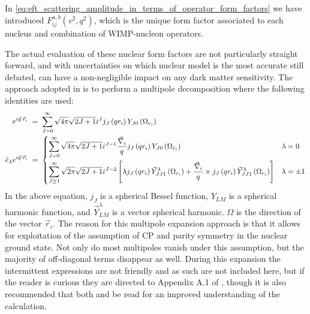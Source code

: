 In \autoref{eq:eft_scattering_amplitude_in_terms_of_operator_form_factors} we have introduced $F_{ij}^{a,b}(v^2,q^2)$, which is the unique form factor associated to each nucleus and combination of WIMP-nucleon operators.
\par
The actual evaluation of these nuclear form factors are not particularly straight forward, and with uncertainties on which nuclear model is the most accurate still debated, can have a non-negligible impact on any dark matter sensitivity.
The approach adopted in \cite{Fitzpatrick_2013_ref} is to perform a multipole decomposition where the following identities are used:
\begin{equation}
\begin{split}
e^{i \vec{q} \cdot \vec{r}_i}\;&=\;\sum_{J=0}^{\infty} \sqrt{4 \pi} \sqrt{2 J+1} i^J j_J\left(q r_i\right) Y_{J 0}\left(\Omega_{r_i}\right) \\
\hat{e}_\lambda e^{i \vec{q} \cdot \vec{r}_i} \; &= \; 
\begin{dcases}
\sum_{J=0}^{\infty} \sqrt{4 \pi} \sqrt{2 J+1} i^{J-1} \frac{\vec{\nabla}_i}{q} j_J\left(q r_i\right) Y_{J 0}\left(\Omega_{r_i}\right) & \lambda=0 \\
\sum_{J \geq 1}^{\infty} \sqrt{2 \pi} \sqrt{2 J+1} i^{J-2}\left[\lambda j_J\left(q r_i\right) \vec{Y}_{J J 1}^\lambda\left(\Omega_{r_i}\right)+\frac{\vec{\nabla}_i}{q} \times j_J\left(q r_i\right) \vec{Y}_{J J 1}^\lambda\left(\Omega_{r_i}\right)\right] & \lambda=\pm 1
\end{dcases}
\end{split}
\label{eq:eft_multipole_expansion}
\end{equation}
In the above equation, $j_J$ is a spherical Bessel function, $Y_{LM}$ is a spherical harmonic function, and $\vec{Y}^{\lambda}_{LM}$ is a vector spherical harmonic.
$\Omega$ is the direction of the vector $\vec{r}_i$.
The reason for this multipole expansion approach is that it allows for exploitation of the assumption of CP and parity symmetry in the nuclear ground state.
Not only do most multipoles vanish under this assumption, but the majority of off-diagonal terms disappear as well.
During this expansion the intermittent expressions are not friendly and as such are not included here, but if the reader is curious they are directed to Appendix A.1 of \cite{Fitzpatrick_2013_ref}, though it is also recommended that both \cite{weak_multipole_expansion_ref} and \cite{semileptonic_multipole_expansion_ref} be read for an improved understanding of the calculation.
\par

